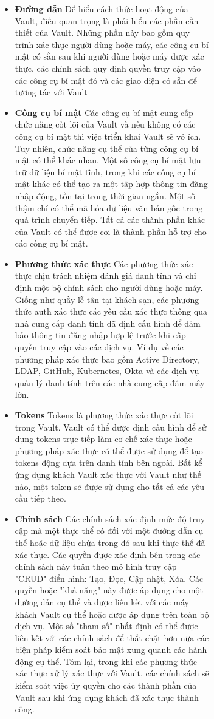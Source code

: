 \documentclass[12pt,a4paper]{report}
\begin{document}
\begin{figure}[htp]
\begin{figure}[htp]
	
	\begin{itemize}
		\item \textbf{Đường dẫn}
		\smallskip
		\subitem
			{Để hiểu cách thức hoạt động của Vault, điều quan trọng là phải hiểu các phần cần thiết của Vault. Những phần này bao gồm quy trình xác thực người dùng hoặc máy, các công cụ bí mật có sẵn sau khi người dùng hoặc máy được xác thực, các chính sách quy định quyền truy cập vào các công cụ bí mật đó và các giao diện có sẵn để tương tác với Vault}
		\item \textbf{Công cụ bí mật}
		\smallskip
		\subitem
			{Các công cụ bí mật cung cấp chức năng cốt lõi của Vault và nếu không có các công cụ bí mật thì việc triển khai Vault sẽ vô ích. Tuy nhiên, chức năng cụ thể của từng công cụ bí mật có thể khác nhau.}
			{Một số công cụ bí mật lưu trữ dữ liệu bí mật tĩnh, trong khi các công cụ bí mật khác có thể tạo ra một tập hợp thông tin đăng nhập động, tồn tại trong thời gian ngắn. Một số thậm chí có thể mã hóa dữ liệu văn bản gốc trong quá trình chuyển tiếp. Tất cả các thành phần khác của Vault có thể được coi là thành phần hỗ trợ cho các công cụ bí mật.}
		\item \textbf{Phương thức xác thực}
		\smallskip
		\subitem
			{Các phương thức xác thực chịu trách nhiệm đánh giá danh tính và chỉ định một bộ chính sách cho người dùng hoặc máy. Giống như quầy lễ tân tại khách sạn, các phương thức auth xác thực các yêu cầu xác thực thông qua nhà cung cấp danh tính đã định cấu hình để đảm bảo thông tin đăng nhập hợp lệ trước khi cấp quyền truy cập vào các dịch vụ. Ví dụ về các phương pháp xác thực bao gồm Active Directory, LDAP, GitHub, Kubernetes, Okta và các dịch vụ quản lý danh tính trên các nhà cung cấp đám mây lớn.}
		\item \textbf{Tokens}
		\smallskip
		\subitem
			{Tokens là phương thức xác thực cốt lõi trong Vault. Vault có thể được định cấu hình để sử dụng tokens trực tiếp làm cơ chế xác thực hoặc phương pháp xác thực có thể được sử dụng để tạo tokens động dựa trên danh tính bên ngoài. Bất kể ứng dụng khách Vault xác thực với Vault như thế nào, một token sẽ được sử dụng cho tất cả các yêu cầu tiếp theo.}
		\item \textbf{Chính sách}
		\smallskip
		\subitem
			{Các chính sách xác định mức độ truy cập mà một thực thể có đối với một đường dẫn cụ thể hoặc dữ liệu chứa trong đó sau khi thực thể đã xác thực. Các quyền được xác định bên trong các chính sách này tuân theo mô hình truy cập "CRUD" điển hình: Tạo, Đọc, Cập nhật, Xóa. Các quyền hoặc "khả năng" này được áp dụng cho một đường dẫn cụ thể và được liên kết với các máy khách Vault cụ thể hoặc được áp dụng trên toàn bộ dịch vụ. Một số "tham số" nhất định có thể được liên kết với các chính sách để thắt chặt hơn nữa các biện pháp kiểm soát bảo mật xung quanh các hành động cụ thể. Tóm lại, trong khi các phương thức xác thực xử lý xác thực với Vault, các chính sách sẽ kiểm soát việc ủy quyền cho các thành phần của Vault sau khi ứng dụng khách đã xác thực thành công.}
	\end{itemize}

\end{figure}
\end{figure}
\end{document}
